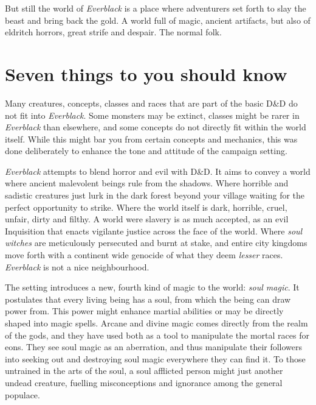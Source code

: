 But still the world of \emph{Everblack} is a place where adventurers set forth
to slay the beast and bring back the gold. A world full of magic, ancient
artifacts, but also of eldritch horrors, great strife and despair. The normal
folk.

\section*{Seven things to you should know}

\begin{enumerate}
  Many creatures, concepts, classes and
 races that are part of the basic D\&D do not fit into \emph{Everblack}. Some
 monsters may be extinct, classes might be rarer in \emph{Everblack} than
 elsewhere, and some concepts do not directly fit within the world
 itself. While this might bar you from certain concepts and mechanics, this
 was done deliberately to enhance the tone and attitude of the campaign
 setting.

  \emph{Everblack} attempts to blend horror and evil with
 D\&D. It aims to convey a world where ancient malevolent beings rule from the
 shadows. Where horrible and sadistic creatures just lurk in the dark forest
 beyond your village waiting for the perfect opportunity to strike. Where the
 world itself is dark, horrible, cruel, unfair, dirty and filthy. A world were
 slavery is as much accepted, as an evil Inquisition that enacts vigilante
 justice across the face of the world. Where \emph{soul witches} are
 meticulously persecuted and burnt at stake, and entire city kingdoms move
 forth with a continent wide genocide of what they deem \emph{lesser} races.
 \emph{Everblack} is not a nice neighbourhood.

  The setting introduces a new, fourth kind of magic to the
 world: \emph{soul magic}. It postulates that every living being has a soul,
 from which the being can draw power from. This power might enhance martial
 abilities or may be directly shaped into magic spells. Arcane and divine
 magic comes directly from the realm of the gods, and they have used both as a
 tool to manipulate the mortal races for eons. They see soul magic as an
 aberration, and thus manipulate their followers into seeking out and
 destroying soul magic everywhere they can find it. To those untrained in the
 arts of the soul, a soul afflicted person might just another undead creature,
 fuelling misconceptions and ignorance among the general populace.


\end{enumerate}
